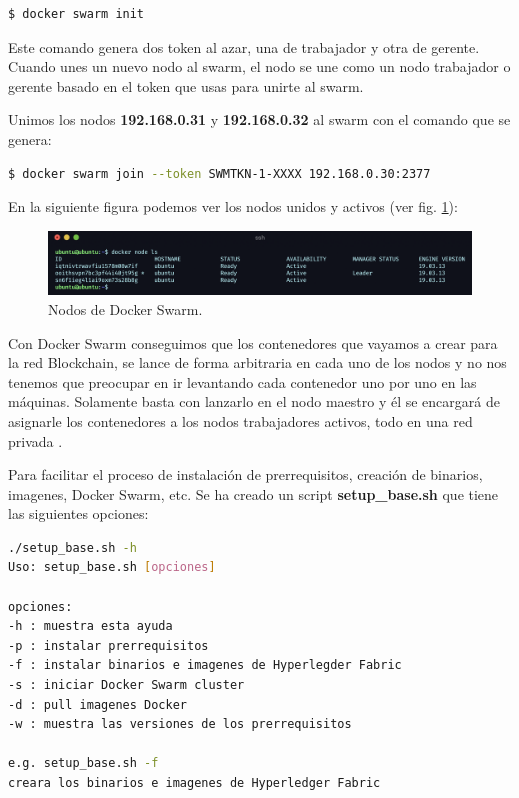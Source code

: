 \begin{lstlisting}[language=bash]
  $ docker swarm init
\end{lstlisting}

\noindent Este comando genera dos token al azar, una de trabajador y otra de gerente. Cuando unes un nuevo nodo al 
swarm, el nodo se une como un nodo trabajador o gerente basado en el token que usas para unirte al swarm.

\vspace{5mm}

\noindent Unimos los nodos \textbf{192.168.0.31} y \textbf{192.168.0.32} al swarm con el comando que se genera: 

\begin{lstlisting}[language=bash]
  $ docker swarm join --token SWMTKN-1-XXXX 192.168.0.30:2377
\end{lstlisting}

\newpage

\noindent En la siguiente figura podemos ver los nodos unidos y activos (ver fig. \ref{fig:node-ls-worker}):

\begin{figure}[ht!]
  \centering
  \includegraphics[width=\textwidth]{imagenes/desarrollo/comandos/node_ls_worker}
  \caption{Nodos de Docker Swarm.}
  \label{fig:node-ls-worker}
\end{figure}

\noindent Con Docker Swarm conseguimos que los contenedores que vayamos a crear para la red Blockchain, se lance de forma 
arbitraria en cada uno de los nodos y no nos tenemos que preocupar en ir levantando cada contenedor uno por uno
en las máquinas. Solamente basta con lanzarlo en el nodo maestro y él se encargará de asignarle los contenedores
a los nodos trabajadores activos, todo en una red privada \cite{hyperledger-fabric-rasp-swarm}.

\vspace{5mm}

\noindent Para facilitar el proceso de instalación de prerrequisitos, creación de binarios, imagenes, Docker Swarm, etc. 
Se ha creado un script \textbf{setup\_base.sh} que tiene las siguientes opciones:

\begin{lstlisting}[language=bash]
./setup_base.sh -h
Uso: setup_base.sh [opciones]

opciones:
-h : muestra esta ayuda
-p : instalar prerrequisitos
-f : instalar binarios e imagenes de Hyperlegder Fabric
-s : iniciar Docker Swarm cluster
-d : pull imagenes Docker
-w : muestra las versiones de los prerrequisitos

e.g. setup_base.sh -f
creara los binarios e imagenes de Hyperledger Fabric
\end{lstlisting}

